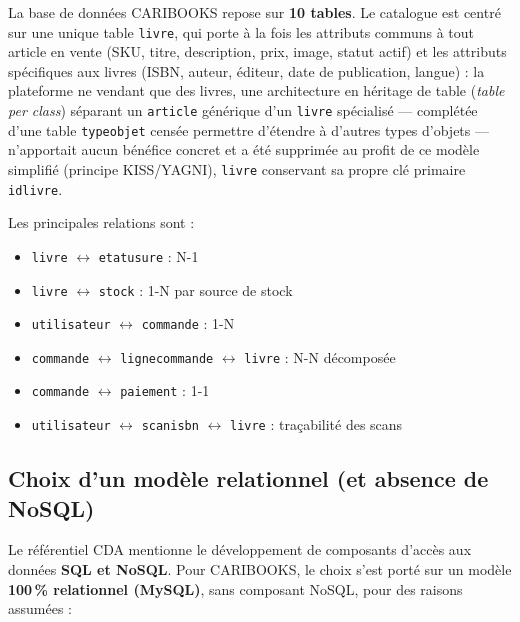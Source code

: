 \documentclass[12pt, a4paper]{report}
\renewcommand{\_}{\origunderscore\allowbreak}
\begin{document}
\noindent La base de données CARIBOOKS repose sur \textbf{10 tables}. Le catalogue est centré sur une unique table \texttt{livre}, qui porte à la fois les attributs communs à tout article en vente (SKU, titre, description, prix, image, statut actif) et les attributs spécifiques aux livres (ISBN, auteur, éditeur, date de publication, langue) : la plateforme ne vendant que des livres, une architecture en héritage de table (\textit{table per class}) séparant un \texttt{article} générique d'un \texttt{livre} spécialisé — complétée d'une table \texttt{type\_objet} censée permettre d'étendre à d'autres types d'objets — n'apportait aucun bénéfice concret et a été supprimée au profit de ce modèle simplifié (principe KISS/YAGNI), \texttt{livre} conservant sa propre clé primaire \texttt{id\_livre}.

\noindent Les principales relations sont :
\begin{itemize}
    \item \texttt{livre} $\leftrightarrow$ \texttt{etat\_usure} : N-1
    \item \texttt{livre} $\leftrightarrow$ \texttt{stock} : 1-N par source de stock
    \item \texttt{utilisateur} $\leftrightarrow$ \texttt{commande} : 1-N
    \item \texttt{commande} $\leftrightarrow$ \texttt{ligne\_commande} $\leftrightarrow$ \texttt{livre} : N-N décomposée
    \item \texttt{commande} $\leftrightarrow$ \texttt{paiement} : 1-1
    \item \texttt{utilisateur} $\leftrightarrow$ \texttt{scan\_isbn} $\leftrightarrow$ \texttt{livre} : traçabilité des scans
\end{itemize}

\subsection{Choix d'un modèle relationnel (et absence de NoSQL)}

Le référentiel CDA mentionne le développement de composants d'accès aux données \textbf{SQL et NoSQL}. Pour CARIBOOKS, le choix s'est porté sur un modèle \textbf{100\,\% relationnel (MySQL)}, sans composant NoSQL, pour des raisons assumées :
\end{document}
